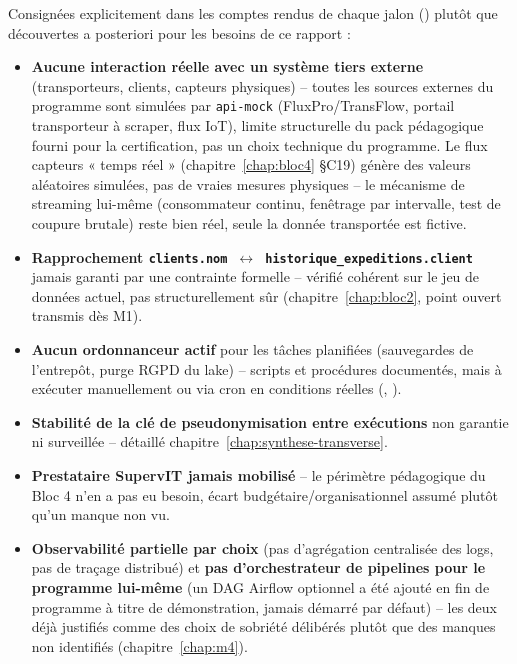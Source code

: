 Consignées explicitement dans les comptes rendus de chaque jalon
() plutôt que découvertes a posteriori
pour les besoins de ce rapport :

\begin{itemize}
  \item \textbf{Aucune interaction réelle avec un système tiers
    externe} (transporteurs, clients, capteurs physiques) -- toutes
    les sources externes du programme sont simulées par
    \texttt{api-mock} (FluxPro/TransFlow, portail transporteur à
    scraper, flux IoT), limite structurelle du pack pédagogique fourni
    pour la certification, pas un choix technique du programme. Le
    flux capteurs « temps réel » (chapitre~\ref{chap:bloc4} §C19)
    génère des valeurs aléatoires simulées, pas de vraies mesures
    physiques -- le mécanisme de streaming lui-même (consommateur
    continu, fenêtrage par intervalle, test de coupure brutale) reste
    bien réel, seule la donnée transportée est fictive.
  \item \textbf{Rapprochement \texttt{clients.nom}~$\leftrightarrow$~\texttt{historique\_expeditions.client}}
    jamais garanti par une contrainte formelle -- vérifié cohérent sur
    le jeu de données actuel, pas structurellement sûr
    (chapitre~\ref{chap:bloc2}, point ouvert transmis dès M1).
  \item \textbf{Aucun ordonnanceur actif} pour les tâches planifiées
    (sauvegardes de l'entrepôt, purge RGPD du lake) -- scripts et
    procédures documentés, mais à exécuter manuellement ou via cron
    en conditions réelles (,
    ).
  \item \textbf{Stabilité de la clé de pseudonymisation entre
    exécutions} non garantie ni surveillée -- détaillé
    chapitre~\ref{chap:synthese-transverse}.
  \item \textbf{Prestataire SupervIT jamais mobilisé} -- le périmètre
    pédagogique du Bloc 4 n'en a pas eu besoin, écart
    budgétaire/organisationnel assumé plutôt qu'un manque non vu.
  \item \textbf{Observabilité partielle par choix} (pas d'agrégation
    centralisée des logs, pas de traçage distribué) et \textbf{pas
    d'orchestrateur de pipelines pour le programme lui-même} (un DAG
    Airflow optionnel a été ajouté en fin de programme à titre de
    démonstration, jamais démarré par défaut) -- les deux déjà
    justifiés comme des choix de sobriété délibérés plutôt que des
    manques non identifiés (chapitre~\ref{chap:m4}).

\end{itemize}
